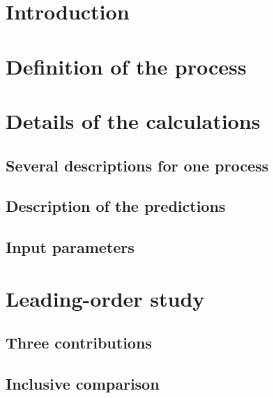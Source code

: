 \documentclass[twocolumn,epjc3]{svjour3} %
\begin{document}
\section{Introduction}



\section{Definition of the process}
\label{sec:definition}



\section{Details of the calculations}
\label{sec:details}

\subsection{Several descriptions for one process}



\subsection{Description of the predictions}



\subsection{Input parameters}
\label{subsec:inputpar}



\section{Leading-order study}
\label{sec:LO}

\subsection{Three contributions}
\label{subsec:contributions}



\subsection{Inclusive comparison}
\label{subsec:LOinclusive}
\end{document}

